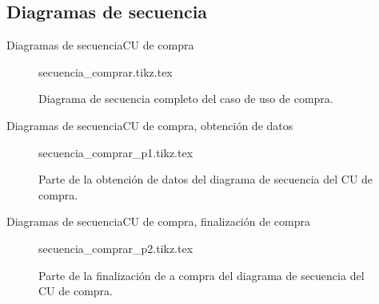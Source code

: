 %
%
%

\subsection{Diagramas de secuencia}


%
%
%

\begin{frame}{Diagramas de secuencia}{CU de compra}

  \begin{figure}
    \begin{center}
      {secuencia_comprar.tikz.tex}
      \caption{Diagrama de secuencia completo del caso de uso de compra.}
    \end{center}
  \end{figure}


\end{frame}

\begin{frame}{Diagramas de secuencia}{CU de compra, obtención de datos}

  \begin{figure}
    \begin{center}
      {secuencia_comprar_p1.tikz.tex}
      \caption{Parte de la obtención de datos del diagrama de secuencia
        del CU de compra.}
    \end{center}
  \end{figure}


\end{frame}

\begin{frame}{Diagramas de secuencia}{CU de compra, finalización de compra}

  \begin{figure}
    \begin{center}
      {secuencia_comprar_p2.tikz.tex}
      \caption{Parte de la finalización de a compra del diagrama de
        secuencia del CU de compra.}
    \end{center}
  \end{figure}


\end{frame}
